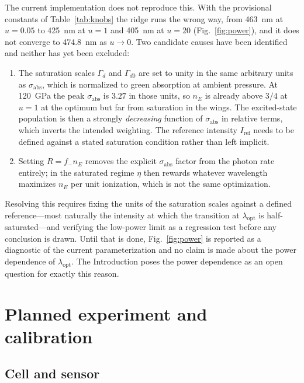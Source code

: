 \documentclass[preprint,12pt]{elsarticle}
\newcommand{\sabs}{\ensuremath{\sigma_{\mathrm{abs}}}}
\newcommand{\fm}{\ensuremath{f_{-}}}
\newcommand{\lopt}{\ensuremath{\lambda_{\mathrm{opt}}}}
\begin{document}
The current implementation does not reproduce this. With the provisional
constants of Table~\ref{tab:knobs} the ridge runs the wrong way, from
\SI{463}{\nano\meter} at $u = 0.05$ to \SI{425}{\nano\meter} at $u = 1$ and
\SI{405}{\nano\meter} at $u = 20$ (Fig.~\ref{fig:power}), and it does not
converge to \SI{474.8}{\nano\meter} as $u \to 0$. Two candidate causes have been
identified and neither has yet been excluded:

\begin{enumerate}
\item The saturation scales $\Gamma_d$ and $\Gamma_{d0}$ are set to unity in the
  same arbitrary units as $\sabs$, which is normalized to green absorption at
  ambient pressure. At \SI{120}{\giga\pascal} the peak $\sabs$ is $3.27$ in those
  units, so $n_E$ is already above $3/4$ at $u = 1$ at the optimum but far from
  saturation in the wings. The excited-state population is then a strongly
  \emph{decreasing} function of $\sabs$ in relative terms, which inverts the
  intended weighting. The reference intensity $I_{\mathrm{ref}}$ needs to be
  defined against a stated saturation condition rather than left implicit.
\item Setting $R = \fm n_E$ removes the explicit $\sabs$ factor from the photon
  rate entirely; in the saturated regime $\eta$ then rewards whatever wavelength
  maximizes $n_E$ per unit ionization, which is not the same optimization.
\end{enumerate}

Resolving this requires fixing the units of the saturation scales against a
defined reference---most naturally the intensity at which the transition at
$\lopt$ is half-saturated---and verifying the low-power limit as a regression
test before any conclusion is drawn. Until that is done, Fig.~\ref{fig:power} is
reported as a diagnostic of the current parameterization and no claim is made
about the power dependence of $\lopt$. The Introduction poses the power
dependence as an open question for exactly this reason.

\section{Planned experiment and calibration}
\label{sec:calibration}

\subsection{Cell and sensor}
\end{document}
